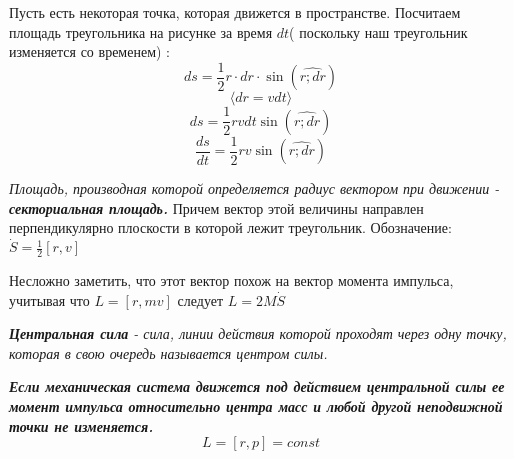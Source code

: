 \documentclass[../main.tex]{subfiles}
\begin{document}
\begin{center}
\end{center}
Пусть есть некоторая точка, которая движется в пространстве. Посчитаем площадь треугольника на рисунке за время $dt$( поскольку наш треугольник изменяется со временем) :
\[ ds  = \frac{1}{2}r \cdot dr \cdot \sin{(\hat{r;dr})} \]
\[ \langle  dr = vdt \rangle \]
\[ ds = \frac{1}{2} rvdt \sin{(\hat{r;dr})} \]
\[\frac{ds}{dt} = \frac{1}{2} rv \sin{(\hat{r;dr})}\]

 \textit{Площадь, производная которой определяется радиус вектором при движении - \textbf{секториальная площадь.}} Причем вектор этой величины направлен перпендикулярно плоскости в которой лежит треугольник. Обозначение: $ \dot S = \frac{1}{2}[r,v]$

\vspace{5px}

Несложно заметить, что этот вектор похож на вектор момента импульса, учитывая что $L = [r, mv]$ следует $L = 2M \dot S$

\vspace{5px}

 \textit{\textbf{Центральная сила} - сила, линии действия которой проходят через одну точку, которая в свою очередь называется центром силы.}

\vspace{5px}

\textbf{\textit{Если механическая система движется под действием центральной силы ее момент импульса относительно центра масс и любой другой неподвижной точки не изменяется.}}
\[L = [r, p] = const\]
\end{document}
